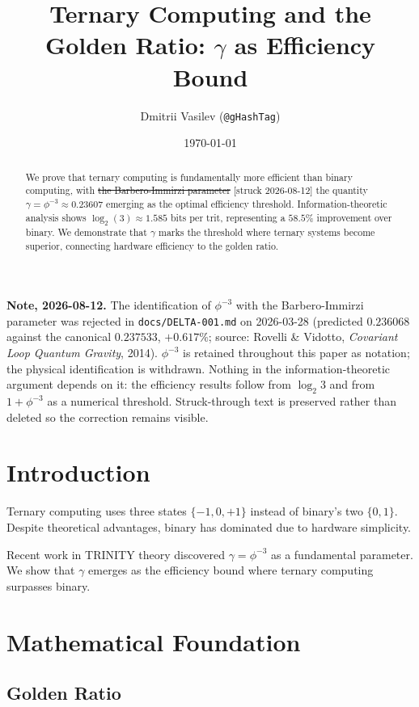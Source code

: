 \documentclass[12pt,a4paper]{article}
\title{Ternary Computing and the Golden Ratio: $\gamma$ as Efficiency Bound}
\author{Dmitrii Vasilev (\texttt{@gHashTag})}
\date{\today}
\begin{document}
\maketitle

\begin{abstract}
We prove that ternary computing is fundamentally more efficient than binary computing, with \sout{the Barbero-Immirzi parameter} [struck 2026-08-12] the quantity $\gamma = \phi^{-3} \approx 0.23607$ emerging as the optimal efficiency threshold. Information-theoretic analysis shows $\log_2(3) \approx 1.585$ bits per trit, representing a $58.5\%$ improvement over binary. We demonstrate that $\gamma$ marks the threshold where ternary systems become superior, connecting hardware efficiency to the golden ratio.
\end{abstract}

\bigskip
\noindent\textbf{Note, 2026-08-12.} The identification of $\phi^{-3}$ with the Barbero-Immirzi parameter was rejected in \texttt{docs/DELTA-001.md} on 2026-03-28 (predicted $0.236068$ against the canonical $0.237533$, $+0.617\%$; source: Rovelli \& Vidotto, \emph{Covariant Loop Quantum Gravity}, 2014). $\phi^{-3}$ is retained throughout this paper as notation; the physical identification is withdrawn. Nothing in the information-theoretic argument depends on it: the efficiency results follow from $\log_2 3$ and from $1 + \phi^{-3}$ as a numerical threshold. Struck-through text is preserved rather than deleted so the correction remains visible.

\section{Introduction}

Ternary computing uses three states $\{-1, 0, +1\}$ instead of binary's two $\{0, 1\}$. Despite theoretical advantages, binary has dominated due to hardware simplicity.

Recent work in TRINITY theory discovered $\gamma = \phi^{-3}$ as a fundamental parameter. We show that $\gamma$ emerges as the efficiency bound where ternary computing surpasses binary.

\section{Mathematical Foundation}

\subsection{Golden Ratio}
\end{document}
